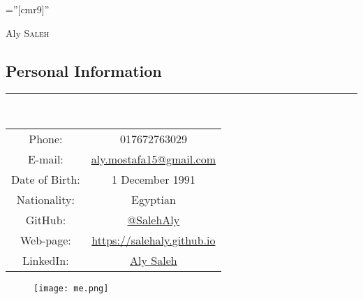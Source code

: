 \documentclass[a4paper,13pt]{article}
\begin{document}
\pagestyle{empty} %

\font\fb=''[cmr9]'' %


\par{\hspace{5cm}\huge Aly \textsc{Saleh}\par} %



\begin{adjustwidth}{-3cm}{}

\section{Personal Information}
\rule[0pt]{20cm}{0.5pt}\\

\begin{center}
	
\begin{tabular}{ c c }

	Phone: & 017672763029\\
	
	E-mail:& \href{mailto:aly.mostafa15@gmail.com}{aly.mostafa15@gmail.com} \\
	
	Date of Birth:& 1 December 1991 \\
	
	Nationality:& Egyptian \\

	GitHub:&  \href{https://github.com/SalehAly}{@SalehAly}\\
	Web-page:& \href{https://salehaly.github.io}{https://salehaly.github.io}\\
	LinkedIn: &\href{https://de.linkedin.com/in/aly-saleh-ba948164}{Aly Saleh}\\

	
\end{tabular}


\end{center}

	\begin{figure}[h]
	
	\vspace{-3cm} \hspace{13cm} \texttt{[image: me.png]}	
	

\end{figure}
\end{adjustwidth}
\end{document}

